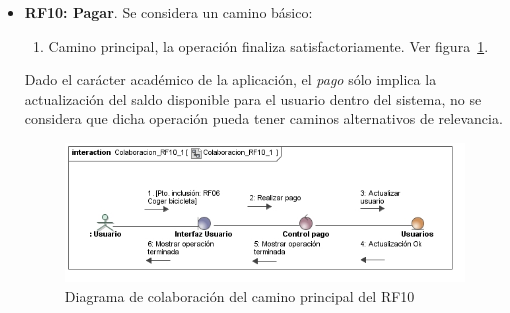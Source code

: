 \begin{itemize}
	\FloatBarrier
	\item \textbf{RF10: Pagar}. Se considera un camino básico:
	\begin{enumerate}
		\item Camino principal, la operación finaliza satisfactoriamente. Ver figura~\ref{fig:diagramaColaboracion_RF10_1}.
	\end{enumerate}
	
	Dado el carácter académico de la aplicación, el \emph{pago} sólo implica la actualización del saldo disponible para el usuario dentro del sistema, no se considera que dicha operación pueda tener caminos alternativos de relevancia.
	\begin{figure} [!htb]
		\centering
		\includegraphics[width=\linewidth,height=\textheight,keepaspectratio]{Images/Diagramas/04_Colaboracion_RF10_1}
		\caption{Diagrama de colaboración del camino principal del RF10}
		\label{fig:diagramaColaboracion_RF10_1}
	\end{figure}
	

\end{itemize}
